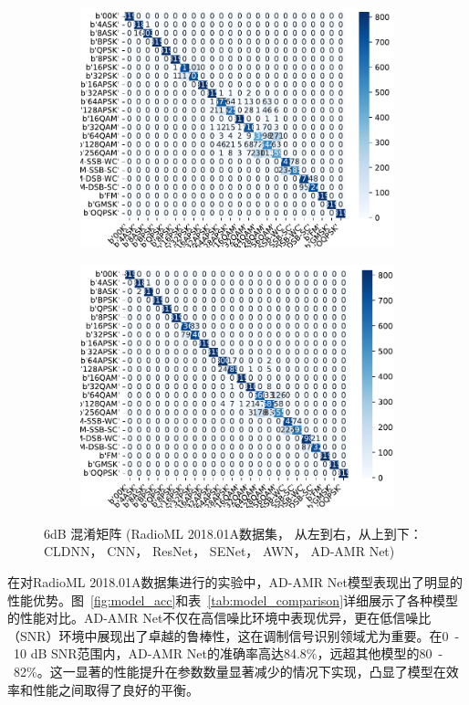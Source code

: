 \begin{figure}[ht]
\begin{subfigure}[b]{0.45\textwidth}
        \includegraphics[width=\textwidth]{Image/awn_18a.pdf}
        \label{fig:image2}
      \end{subfigure}
      \hfill
        \begin{subfigure}[b]{0.45\textwidth}
            \includegraphics[width=\textwidth]{Image/proposed_18a.pdf}
            \label{fig:image2}
            \end{subfigure}
    \caption{6dB 混淆矩阵 (RadioML 2018.01A数据集， 从左到右，从上到下：CLDNN， CNN， ResNet， SENet， AWN， AD-AMR Net)}
    \label{fig:16a_matrix}
  \end{figure}

在对RadioML 2018.01A数据集进行的实验中，AD-AMR Net模型表现出了明显的性能优势。图~\ref{fig:model_acc}和表~\ref{tab:model_comparison}详细展示了各种模型的性能对比。AD-AMR Net不仅在高信噪比环境中表现优异，更在低信噪比（SNR）环境中展现出了卓越的鲁棒性，这在调制信号识别领域尤为重要。在0~-~10 dB SNR范围内，AD-AMR Net的准确率高达84.8\%，远超其他模型的80~-~82\%。这一显著的性能提升在参数数量显著减少的情况下实现，凸显了模型在效率和性能之间取得了良好的平衡。

